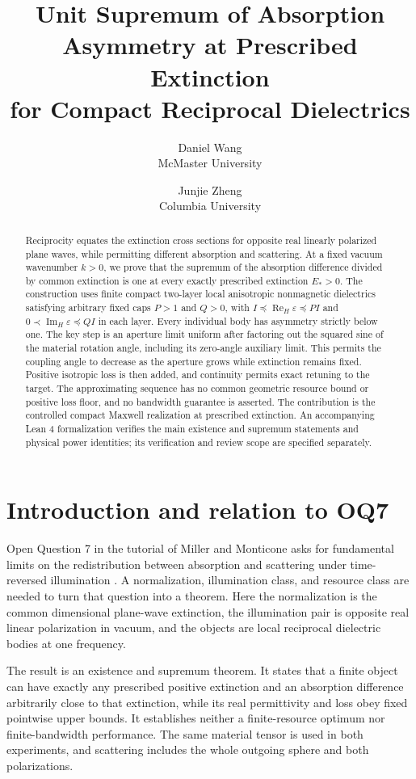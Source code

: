 \documentclass[11pt]{article}
\title{Unit Supremum of Absorption Asymmetry at Prescribed Extinction\\for Compact Reciprocal Dielectrics}
\author{Daniel Wang\\McMaster University \and Junjie Zheng\\Columbia University}
\date{}
\newcommand{\ReH}{\operatorname{Re}_{\!H}}
\newcommand{\ImH}{\operatorname{Im}_{\!H}}
\begin{document}
\maketitle
\begin{abstract}
Reciprocity equates the extinction cross sections for opposite real linearly polarized plane waves, while permitting different absorption and scattering. At a fixed vacuum wavenumber $k>0$, we prove that the supremum of the absorption difference divided by common extinction is one at every exactly prescribed extinction $E_*>0$. The construction uses finite compact two-layer local anisotropic nonmagnetic dielectrics satisfying arbitrary fixed caps $P>1$ and $Q>0$, with $I\preceq\ReH\varepsilon\preceq PI$ and $0\prec\ImH\varepsilon\preceq QI$ in each layer. Every individual body has asymmetry strictly below one. The key step is an aperture limit uniform after factoring out the squared sine of the material rotation angle, including its zero-angle auxiliary limit. This permits the coupling angle to decrease as the aperture grows while extinction remains fixed. Positive isotropic loss is then added, and continuity permits exact retuning to the target. The approximating sequence has no common geometric resource bound or positive loss floor, and no bandwidth guarantee is asserted. The contribution is the controlled compact Maxwell realization at prescribed extinction. An accompanying Lean 4 formalization verifies the main existence and supremum statements and physical power identities; its verification and review scope are specified separately.
\end{abstract}

\section{Introduction and relation to OQ7}\label{sec:intro}
Open Question 7 in the tutorial of Miller and Monticone asks for fundamental limits on the redistribution between absorption and scattering under time-reversed illumination \citep{MillerMonticone2026}. A normalization, illumination class, and resource class are needed to turn that question into a theorem. Here the normalization is the common dimensional plane-wave extinction, the illumination pair is opposite real linear polarization in vacuum, and the objects are local reciprocal dielectric bodies at one frequency.

The result is an existence and supremum theorem. It states that a finite object can have exactly any prescribed positive extinction and an absorption difference arbitrarily close to that extinction, while its real permittivity and loss obey fixed pointwise upper bounds. It establishes neither a finite-resource optimum nor finite-bandwidth performance. The same material tensor is used in both experiments, and scattering includes the whole outgoing sphere and both polarizations.
\end{document}

